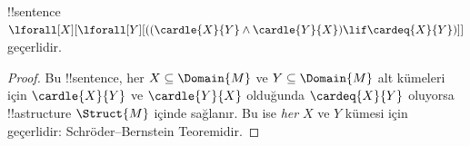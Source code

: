 \documentclass[../../../include/open-logic-section]{subfiles}
\begin{document}
\begin{prop}
!!{sentence} $\lforall[X][\lforall[Y][((\cardle{X}{Y} \land
    \cardle{Y}{X}) \lif \cardeq{X}{Y})]]$ geçerlidir.
\end{prop}

\begin{proof}
Bu !!{sentence}, her $X\subseteq\Domain{M}$ ve $Y\subseteq\Domain{M}$ alt
kümeleri için $\cardle{X}{Y}$ ve $\cardle{Y}{X}$ olduğunda
$\cardeq{X}{Y}$ oluyorsa !!a{structure} $\Struct{M}$ içinde sağlanır. Bu
ise \emph{her} $X$ ve $Y$ kümesi için geçerlidir: Schröder--Bernstein
Teoremidir.
\end{proof}
\end{document}
